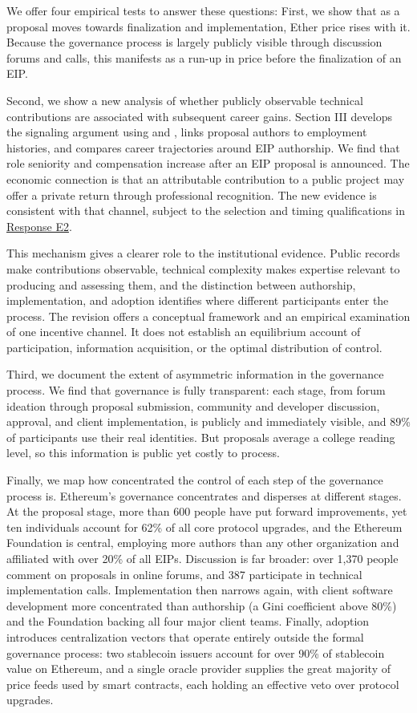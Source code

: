 \documentclass[11pt,letterpaper]{article}
\newcommand{\replyref}[1]{\hyperref[pt:#1]{Response #1}}
\begin{document}
We offer four empirical tests to answer these questions: First, we show that as a proposal moves towards finalization and implementation, Ether price rises with it. Because the governance process is largely publicly visible through discussion forums and calls, this manifests as a run-up in price before the finalization of an EIP.  

Second, we show a new analysis of whether publicly observable technical contributions are associated with subsequent career gains. Section III develops the signaling argument using \citet{Spence1973} and \citet{LernerTirole2002,LernerTirole2005}, links proposal authors to employment histories, and compares career trajectories around EIP authorship. We find that role seniority and compensation increase after an EIP proposal is announced. The economic connection is that an attributable contribution to a public project may offer a private return through professional recognition. The new evidence is consistent with that channel, subject to the selection and timing qualifications in \replyref{E2}.

This mechanism gives a clearer role to the institutional evidence. Public records make contributions observable, technical complexity makes expertise relevant to producing and assessing them, and the distinction between authorship, implementation, and adoption identifies where different participants enter the process. The revision offers a conceptual framework and an empirical examination of one incentive channel. It does not establish an equilibrium account of participation, information acquisition, or the optimal distribution of control. 

Third, we document the extent of asymmetric information in the governance process. We find that governance is fully transparent: each stage, from forum ideation through proposal submission, community and developer discussion, approval, and client implementation, is publicly and immediately visible, and 89\% of participants use their real identities. But proposals average a college reading level, so this information is public yet costly to process.

Finally, we map how concentrated the control of each step of the governance process is. Ethereum’s governance concentrates and disperses at different stages. At the proposal stage, more than 600 people have put forward improvements, yet ten individuals account for 62\% of all core protocol upgrades, and the Ethereum Foundation is central, employing more authors than any other organization and affiliated with over 20\% of all EIPs. Discussion is far broader: over 1,370 people comment on proposals in online forums, and 387 participate in technical implementation calls. Implementation then narrows again, with client software development more concentrated than authorship (a Gini coefficient above 80\%) and the Foundation backing all four major client teams. Finally, adoption introduces centralization vectors that operate entirely outside the formal governance process: two stablecoin issuers account for over 90\% of stablecoin value on Ethereum, and a single oracle provider supplies the great majority of price feeds used by smart contracts, each holding an effective veto over protocol upgrades.
\end{document}
